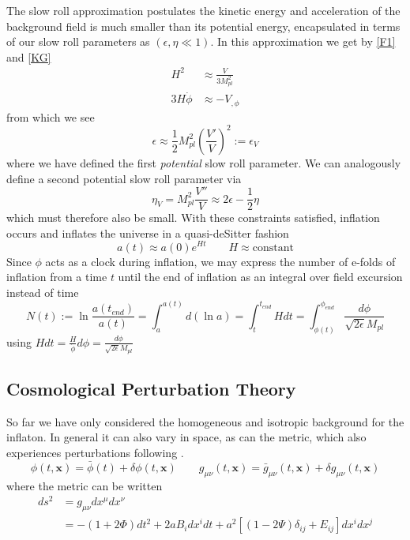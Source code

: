 \documentclass[a4paper,10pt]{article}
\renewcommand{\v}[1]{\mathbf{#1}}
\newcommand{\Mp}{M_{pl}}
\newcommand{\half}{\frac{1}{2}}
\newcommand{\bphi}{\bar{\phi}}
\begin{document}
The slow roll approximation postulates the kinetic energy and acceleration of the background field is much smaller than its potential energy, encapsulated in terms of our slow roll parameters as $(\epsilon, \eta \ll 1)$. In this approximation we get by \ref{F1} and \ref{KG} 
\begin{equation}\begin{split}
H^2 &\approx \frac{V}{3\Mp^2} \\
3H\dot{\phi} &\approx -V_{,\phi}
\end{split}\end{equation}
from which we see 
\begin{equation}
\epsilon \approx \half\Mp^2 (\frac{V'}{V})^2 := \epsilon_V
\end{equation}
where we have defined the first \textit{potential} slow roll parameter. We can analogously define a second potential slow roll parameter via
\begin{equation}
\eta_V = \Mp^2 \frac{V''}{V} \approx 2\epsilon - \half\eta
\end{equation}
which must therefore also be small. With these constraints satisfied, inflation occurs and inflates the universe in a quasi-deSitter fashion
\begin{equation}
a(t) \approx a(0)e^{Ht} \qquad H\approx\text{constant}
\end{equation} 
Since $\phi$ acts as a clock during inflation, we may express the number of e-folds of inflation from a time $t$ until the end of inflation as an integral over field excursion instead of time
\begin{equation}
N(t) := \ln{\frac{a(t_{end})}{a(t)}} = \int_a^{a(t)} d(\ln{a}) = \int_t^{t_{end}} Hdt = \int_{\phi(t)}^{\phi_{end}} \frac{d\phi}{\sqrt{2\epsilon}\Mp}
\label{efolds}
\end{equation}
using $Hdt=\frac{H}{\dot{\phi}}d\phi=\frac{d\phi}{\sqrt{2\epsilon}\Mp}$


\subsection{Cosmological Perturbation Theory}
So far we have only considered the homogeneous and isotropic background for the inflaton. In general it can also vary in space, as can the metric, which also experiences perturbations following \cite{CMBPol}.
\begin{equation}
\phi(t,\v{x}) = \bphi(t) +\delta\phi(t,\v{x}) \qquad g_{\mu\nu}(t,\v{x}) = \bar{g}_{\mu\nu}(t,\v{x}) +\delta g_{\mu\nu}(t,\v{x})
\end{equation}
where the metric can be written
\begin{equation}
\begin{split}
ds^2 &= g_{\mu\nu}dx^\mu dx^\nu\\
&= -(1+2\Phi)dt^2 + 2aB_idx^idt+a^2[(1-2\Psi)\delta_{ij}+E_{ij}]dx^idx^j
\end{split}
\label{metricperturb}
\end{equation}
\end{document}
